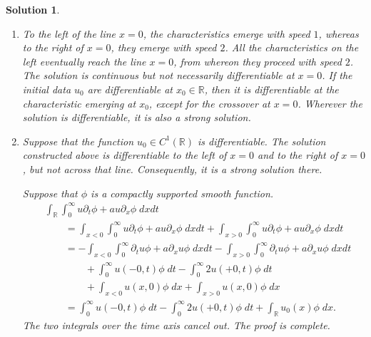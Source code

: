 \documentclass[10pt,letterpaper]{article}
\theoremstyle{break}
\newtheorem{solution}{Solution}
\begin{document}
\begin{solution}
    \begin{enumerate}
        \item
        To the left of the line $x=0$, the characteristics emerge with speed $1$, whereas to the right of $x=0$, they emerge with speed $2$.
        All the characteristics on the left eventually reach the line $x=0$, from whereon they proceed with speed $2$.
        The solution is continuous but not necessarily differentiable at $x=0$.
        If the initial data $u_{0}$ are differentiable at $x_0 \in \mathbb R$, then it is differentiable at the characteristic emerging at $x_0$, except for the crossover at $x=0$.
        Wherever the solution is differentiable, it is also a strong solution. 
        \item
        Suppose that the function $u_0 \in C^{1}(\mathbb R)$ is differentiable. 
        The solution constructed above is differentiable to the left of $x=0$ and to the right of $x=0$, but not across that line.
        Consequently, it is a strong solution there.
        
        Suppose that $\phi$ is a compactly supported smooth function. 
        \begin{align}
         &
         \int_{\mathbb R} \int_{0}^{\infty} u \partial_t \phi + a u \partial_x \phi \;dxdt
         \\&\qquad
         =
         \int_{x < 0} \int_{0}^{\infty} u \partial_t \phi + a u \partial_x \phi \;dxdt
         + 
         \int_{x > 0} \int_{0}^{\infty} u \partial_t \phi + a u \partial_x \phi \;dxdt
         \\
         &\qquad
         =
         -
         \int_{x < 0} \int_{0}^{\infty} \partial_t u \phi + a \partial_x u \phi \;dxdt
         - 
         \int_{x > 0} \int_{0}^{\infty} \partial_t u \phi + a \partial_x u \phi \;dxdt
         \\&\qquad \qquad 
         +
         \int_{0}^{\infty} u(-0,t) \phi \;dt
         - 
         \int_{0}^{\infty} 2u(+0,t) \phi \;dt
         \\&\qquad \qquad 
         +
         \int_{x < 0} u(x,0) \phi \;dx
         + 
         \int_{x > 0} u(x,0) \phi \;dx
         \\&\qquad 
         =
         \int_{0}^{\infty} u(-0,t) \phi \;dt
         - 
         \int_{0}^{\infty} 2u(+0,t) \phi \;dt
         +
         \int_{\mathbb R} u_{0}(x) \phi \;dx
         .
        \end{align}
        The two integrals over the time axis cancel out.
        The proof is complete.
    \end{enumerate}
\end{solution}
\end{document}
